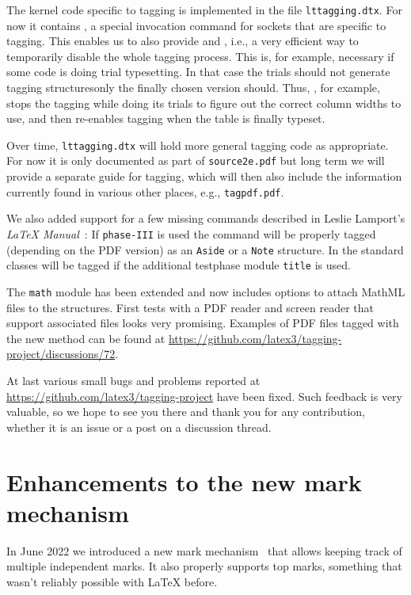 \documentclass{ltnews}
\providecommand\Dash {\unskip \textemdash}
\begin{document}
The kernel code specific to tagging is implemented in the file
\texttt{lttagging.dtx}. For now it contains , a
special invocation command for sockets that are specific to
tagging. This enables us to also provide  and
, i.e., a very efficient way to temporarily disable
the whole tagging process. This is, for example, necessary if some
code is doing trial typesetting. In that case the trials should not
generate tagging structures\Dash only the finally chosen version
should. Thus, , for example, stops the tagging while
doing its trials to figure out the correct column widths to use, and
then re-enables tagging when the table is finally typeset.

Over time, \texttt{lttagging.dtx} will hold more general tagging code
as appropriate. For now it is only documented as part of
\texttt{source2e.pdf} but long term we will provide a separate guide
for tagging, which will then also include the information currently
found in various other places, e.g., \texttt{tagpdf.pdf}.

We also added support for a few missing commands
described in Leslie Lamport's \emph{\LaTeX{}
Manual}~\cite{39:Lamport}: If \texttt{phase-III} is used
the  command will be properly tagged (depending on
the PDF version) as an \texttt{Aside} or a \texttt{Note} structure.
In the standard classes  will be tagged if the additional
testphase module \texttt{title} is used.

The \texttt{math} module has been extended and now includes
options to attach MathML files to the structures.
First tests with a PDF reader and screen reader that support
associated files looks very promising. Examples of PDF files tagged with the 
new method can be found at 
\url{https://github.com/latex3/tagging-project/discussions/72}.

At last various small bugs and problems reported at
\url{https://github.com/latex3/tagging-project}
have been fixed.
Such feedback is very valuable,
so we hope to see you there and thank you for
any contribution, whether it is an issue or a post on a discussion
thread.



\section{Enhancements to the new mark mechanism}

In June 2022 we introduced a new mark mechanism~\cite[p.~76]{39:ltnews} that allows keeping track of multiple
independent marks. It also properly supports top marks, something that wasn't
reliably possible with \LaTeX{} before.
\end{document}
